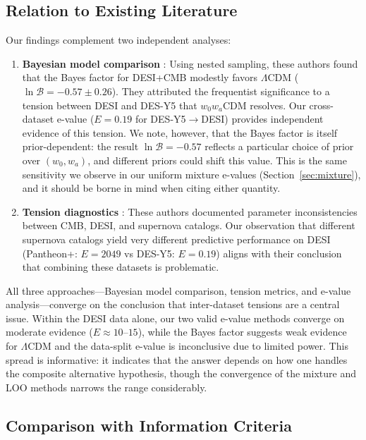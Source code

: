 \documentclass[11pt,a4paper]{article}
\newcommand{\LCDM}{$\Lambda$CDM}
\begin{document}
\subsection{Relation to Existing Literature}

Our findings complement two independent analyses:

\begin{enumerate}
    \item \textbf{Bayesian model comparison} \citep{OngBayesian2025}: Using nested sampling, these authors found that the Bayes factor for DESI+CMB modestly favors \LCDM{} ($\ln \mathcal{B} = -0.57 \pm 0.26$). They attributed the frequentist significance to a tension between DESI and DES-Y5 that $w_0w_a$CDM resolves. Our cross-dataset e-value ($E = 0.19$ for DES-Y5$\rightarrow$DESI) provides independent evidence of this tension. We note, however, that the Bayes factor is itself prior-dependent: the result $\ln \mathcal{B} = -0.57$ reflects a particular choice of prior over $(w_0, w_a)$, and different priors could shift this value. This is the same sensitivity we observe in our uniform mixture e-values (Section~\ref{sec:mixture}), and it should be borne in mind when citing either quantity.

    \item \textbf{Tension diagnostics} \citep{WangMota2025}: These authors documented parameter inconsistencies between CMB, DESI, and supernova catalogs. Our observation that different supernova catalogs yield very different predictive performance on DESI (Pantheon+: $E = 2049$ vs DES-Y5: $E = 0.19$) aligns with their conclusion that combining these datasets is problematic.
\end{enumerate}

All three approaches---Bayesian model comparison, tension metrics, and e-value analysis---converge on the conclusion that inter-dataset tensions are a central issue. Within the DESI data alone, our two valid e-value methods converge on moderate evidence ($E \approx 10$--$15$), while the Bayes factor suggests weak evidence for \LCDM{} and the data-split e-value is inconclusive due to limited power. This spread is informative: it indicates that the answer depends on how one handles the composite alternative hypothesis, though the convergence of the mixture and LOO methods narrows the range considerably.

\subsection{Comparison with Information Criteria}
\label{sec:infocriteria}
\end{document}
